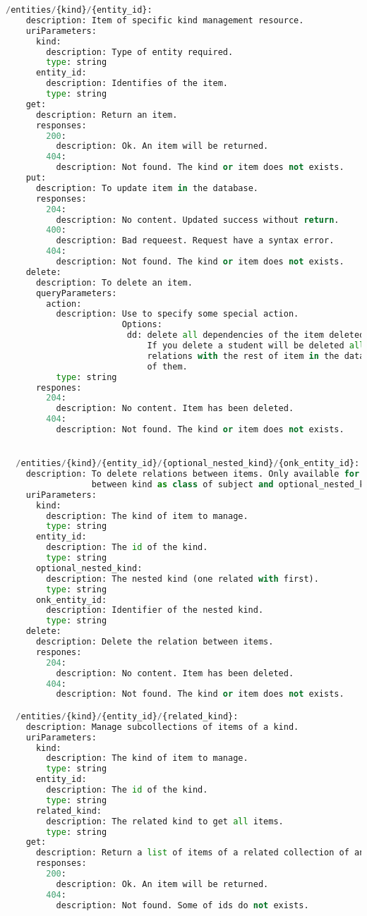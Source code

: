 \begin{lstlisting}[language=python,frame=none]
  /entities/{kind}/{entity_id}:
    description: Item of specific kind management resource.
    uriParameters:
      kind:
        description: Type of entity required.
        type: string
      entity_id:
        description: Identifies of the item.
        type: string
    get:
      description: Return an item.
      responses:
        200:
          description: Ok. An item will be returned.
        404:
          description: Not found. The kind or item does not exists.
    put:
      description: To update item in the database.
      responses:
        204:
          description: No content. Updated success without return.
        400:
          description: Bad requeest. Request have a syntax error.
        404:
          description: Not found. The kind or item does not exists.
    delete:
      description: To delete an item.
      queryParameters:
        action:
          description: Use to specify some special action.
                       Options:
                        dd: delete all dependencies of the item deleted.
                            If you delete a student will be deleted all
                            relations with the rest of item in the database
                            of them.
          type: string
      respones:
        204:
          description: No content. Item has been deleted.
        404:
          description: Not found. The kind or item does not exists.


  /entities/{kind}/{entity_id}/{optional_nested_kind}/{onk_entity_id}:
    description: To delete relations between items. Only available for now
                 between kind as class of subject and optional_nested_kind as student.
    uriParameters:
      kind:
        description: The kind of item to manage.
        type: string
      entity_id:
        description: The id of the kind.
        type: string
      optional_nested_kind:
        description: The nested kind (one related with first).
        type: string
      onk_entity_id:
        description: Identifier of the nested kind.
        type: string
    delete:
      description: Delete the relation between items.
      respones:
        204:
          description: No content. Item has been deleted.
        404:
          description: Not found. The kind or item does not exists.

  /entities/{kind}/{entity_id}/{related_kind}:
    description: Manage subcollections of items of a kind.
    uriParameters:
      kind:
        description: The kind of item to manage.
        type: string
      entity_id:
        description: The id of the kind.
        type: string
      related_kind:
        description: The related kind to get all items.
        type: string
    get:
      description: Return a list of items of a related collection of another.
      responses:
        200:
          description: Ok. An item will be returned.
        404:
          description: Not found. Some of ids do not exists.


\end{lstlisting}
